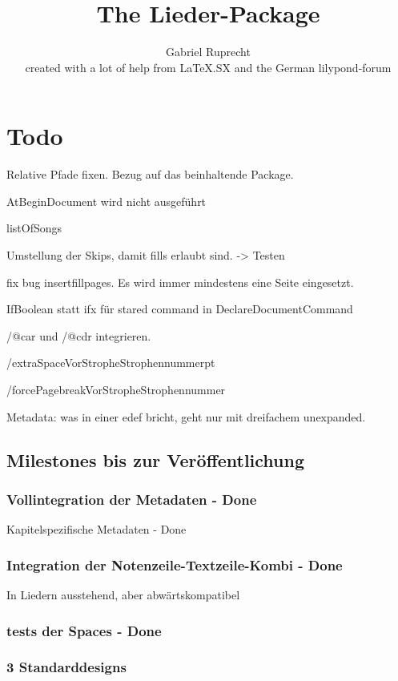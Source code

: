 \documentclass[12pt,a4paper]{scrreprt}
\title{The Lieder-Package}
\subtitle{\textipa{[D@ li:d\textturna-p\ae kIdZ]}}
\author{Gabriel Ruprecht\\ \normalsize{created with a lot of help from \LaTeX .SX and the German lilypond-forum}
}
\begin{document}
\maketitle


\tableofcontents

\chapter*{Todo}

Relative Pfade fixen. Bezug auf das beinhaltende Package.

AtBeginDocument wird nicht ausgeführt

listOfSongs

Umstellung der Skips, damit fills erlaubt sind. -> Testen

fix bug insertfillpages. Es wird immer mindestens eine Seite eingesetzt.

IfBoolean statt ifx für stared command in DeclareDocumentCommand

/@car und /@cdr integrieren.

/extraSpaceVorStrophe{Strophennummer}{pt}

/forcePagebreakVorStrophe{Strophennummer}

Metadata: was in einer edef bricht, geht nur mit dreifachem unexpanded.

\section{Milestones bis zur Veröffentlichung}

\subsection{Vollintegration der Metadaten - Done}
Kapitelspezifische Metadaten - Done

\subsection{Integration der Notenzeile-Textzeile-Kombi - Done}
In Liedern ausstehend, aber abwärtskompatibel

\subsection{tests der Spaces - Done}

\subsection{3 Standarddesigns}
\end{document}
